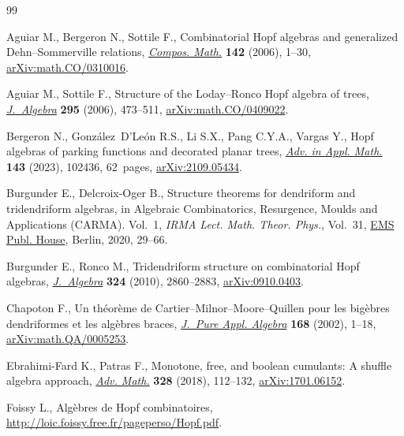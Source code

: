 \begin{thebibliography}{99}
\footnotesize\itemsep=0pt

Aguiar M., Bergeron N., Sottile F., Combinatorial {H}opf algebras and
 generalized {D}ehn--{S}ommerville relations, \href{https://doi.org/10.1112/S0010437X0500165X}{\textit{Compos. Math.}}
 \textbf{142} (2006), 1--30, \href{https://arxiv.org/abs/math.CO/0310016}{arXiv:math.CO/0310016}.

Aguiar M., Sottile F., Structure of the {L}oday--{R}onco {H}opf algebra of
 trees, \href{https://doi.org/10.1016/j.jalgebra.2005.06.021}{\textit{J.~Algebra}} \textbf{295} (2006), 473--511,
 \href{https://arxiv.org/abs/math.CO/0409022}{arXiv:math.CO/0409022}.

Bergeron N., Gonz\'alez~D'Le\'on R.S., Li S.X., Pang C.Y.A., Vargas Y., Hopf
 algebras of parking functions and decorated planar trees, \href{https://doi.org/10.1016/j.aam.2022.102436}{\textit{Adv. in
 Appl. Math.}} \textbf{143} (2023), 102436, 62~pages, \href{https://arxiv.org/abs/2109.05434}{arXiv:2109.05434}.

Burgunder E., Delcroix-Oger B., Structure theorems for dendriform and
 tridendriform algebras, in Algebraic {C}ombinatorics, {R}esurgence, {M}oulds
 and {A}pplications ({CARMA}). {V}ol.~1, \textit{IRMA Lect. Math. Theor.
 Phys.}, Vol.~31, \href{https://doi.org/10.4171/204-1/2}{EMS Publ. House}, Berlin, 2020, 29--66.

Burgunder E., Ronco M., Tridendriform structure on combinatorial {H}opf
 algebras, \href{https://doi.org/10.1016/j.jalgebra.2010.07.010}{\textit{J.~Algebra}} \textbf{324} (2010), 2860--2883,
 \href{https://arxiv.org/abs/0910.0403}{arXiv:0910.0403}.

Chapoton F., Un th\'eor\`eme de {C}artier--{M}ilnor--{M}oore--{Q}uillen pour
 les big\`ebres dendriformes et les alg\`ebres braces, \href{https://doi.org/10.1016/S0022-4049(01)00052-4}{\textit{J.~Pure Appl.
 Algebra}} \textbf{168} (2002), 1--18, \href{https://arxiv.org/abs/math.QA/0005253}{arXiv:math.QA/0005253}.

Ebrahimi-Fard K., Patras F., Monotone, free, and boolean cumulants: {A} shuffle
 algebra approach, \href{https://doi.org/10.1016/j.aim.2018.01.003}{\textit{Adv. Math.}} \textbf{328} (2018), 112--132,
 \href{https://arxiv.org/abs/1701.06152}{arXiv:1701.06152}.

Foissy L., Alg\`ebres de {Hopf} combinatoires,
 \url{http://loic.foissy.free.fr/pageperso/Hopf.pdf}.


\end{thebibliography}
